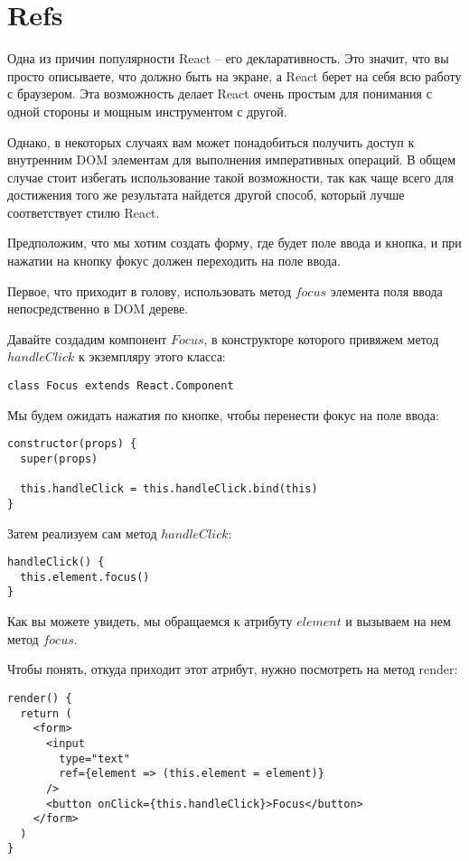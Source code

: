 \section{Refs}

Одна из причин популярности React -- его декларативность. Это значит, что вы просто описываете, что должно быть на экране, а React берет на себя всю работу с браузером. Эта возможность делает React очень простым для понимания с одной стороны и мощным инструментом с другой.

Однако, в некоторых случаях вам может понадобиться получить доступ к внутренним DOM элементам для выполнения императивных операций. В общем случае стоит избегать использование такой возможности, так как чаще всего для достижения того же результата найдется другой способ, который лучше соответствует стилю React.

Предположим, что мы хотим создать форму, где будет поле ввода и кнопка, и при нажатии на кнопку фокус должен переходить на поле ввода.

Первое, что приходит в голову, использовать метод $focus$ элемента поля ввода непосредственно в DOM дереве.

Давайте создадим компонент $Focus$, в конструкторе которого привяжем метод $handleClick$ к экземпляру этого класса:

\begin{lstlisting}
class Focus extends React.Component
\end{lstlisting}

Мы будем ожидать нажатия по кнопке, чтобы перенести фокус на поле ввода:

\begin{lstlisting}
constructor(props) {
  super(props)
  
  this.handleClick = this.handleClick.bind(this)
}
\end{lstlisting}

Затем реализуем сам метод $handleClick$:

\begin{lstlisting}
handleClick() {
  this.element.focus()
}
\end{lstlisting}

Как вы можете увидеть, мы обращаемся к атрибуту $element$ и вызываем на нем метод $focus$.

Чтобы понять, откуда приходит этот атрибут, нужно посмотреть на метод render:

\begin{lstlisting}
render() {
  return (
    <form>
      <input
        type="text"
        ref={element => (this.element = element)}
      />
      <button onClick={this.handleClick}>Focus</button>
    </form>
  )
}
\end{lstlisting}

